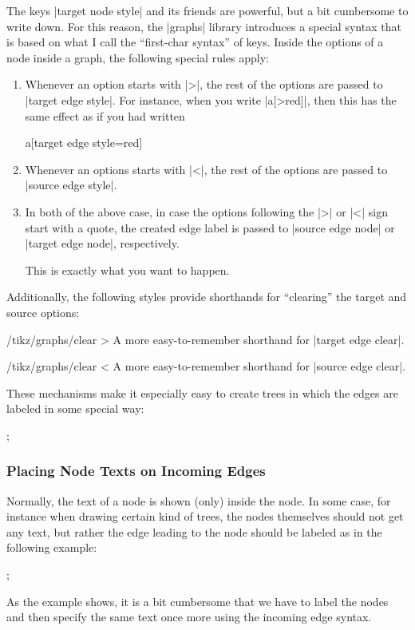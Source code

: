 The keys |target node style| and its friends are powerful, but a bit
cumbersome to write down. For this reason, the |graphs| library
introduces a special syntax that is based on what I call the
``first-char syntax'' of keys. Inside the options of a node inside a
graph, the following special rules apply:
\begin{enumerate}
\item Whenever an option starts with |>|, the rest of the options are
  passed to |target edge style|. For instance, when you write
  |a[>red]|, then this has the same effect as if you had written
\begin{codeexample}
a[target edge style={red}]    
\end{codeexample}
\item Whenever an options starts with |<|, the rest of the options are
  passed to |source edge style|.
\item In both of the above case, in case the options following the |>|
  or |<| sign start with a quote, the created edge label is passed to
  |source edge node| or |target edge node|, respectively.

  This is exactly what you want to happen.
\end{enumerate}
Additionally, the following styles provide shorthands for ``clearing''
the target and source options:
\begin{key}{/tikz/graphs/clear >}
  A more easy-to-remember shorthand for |target edge clear|.  
\end{key}
\begin{key}{/tikz/graphs/clear <}
  A more easy-to-remember shorthand for |source edge clear|.  
\end{key}

These mechanisms make it especially easy to create trees in which the
edges are labeled in some special way:
\begin{codeexample}[]
\tikz 
  ;
\end{codeexample}


\subsubsection{Placing Node Texts on Incoming Edges}

Normally, the text of a node is shown (only) inside the node. In some
case, for instance when drawing certain kind of trees, the nodes
themselves should not get any text, but rather the edge leading to the
node should be labeled as in the following example:
\begin{codeexample}[]
\tikz {};
\end{codeexample}
As the example shows, it is a bit cumbersome that we have to label the
nodes and then specify the same text once more using the incoming edge
syntax.

